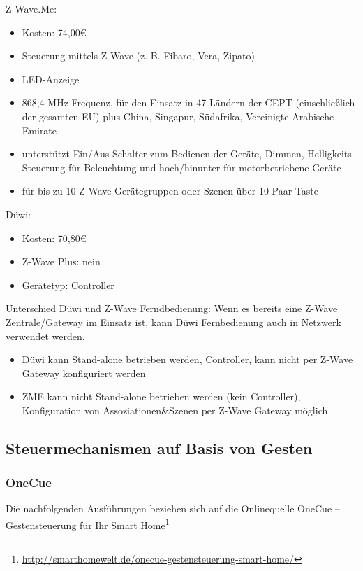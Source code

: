 \noindent
Z-Wave.Me: 

\begin{itemize}
\item Kosten: 74,00€
\item Steuerung mittels Z-Wave (z. B. Fibaro, Vera, Zipato) 
\item LED-Anzeige
\item 868,4 MHz Frequenz, für den Einsatz in 47 Ländern der CEPT (einschließlich der gesamten EU) plus China, Singapur, Südafrika, Vereinigte Arabische Emirate
\item unterstützt Ein/Aus-Schalter zum Bedienen der Geräte, Dimmen, Helligkeits-Steuerung für Beleuchtung und hoch/hinunter für motorbetriebene Geräte
\item für bis zu 10 Z-Wave-Gerätegruppen oder Szenen über 10 Paar Taste
\end{itemize}

\noindent
Düwi: 

\begin{itemize}
\item Kosten: 70,80€
\item Z-Wave Plus: nein 
\item Gerätetyp: Controller
\end{itemize}

\noindent
Unterschied Düwi und Z-Wave Ferndbedienung: 
Wenn es bereits eine Z-Wave Zentrale/Gateway im Einsatz ist, kann Düwi Fernbedienung auch in
Netzwerk verwendet werden.

\begin{itemize}
\item Düwi kann Stand-alone betrieben werden, Controller, kann nicht per Z-Wave Gateway konfiguriert werden
\item ZME kann nicht Stand-alone betrieben werden (kein Controller), Konfiguration von Assoziationen\&Szenen per Z-Wave Gateway möglich
\end{itemize}

\subsection{Steuermechanismen auf Basis von Gesten}

\subsubsection{OneCue}

Die nachfolgenden Ausführungen beziehen sich auf die Onlinequelle \glqq OneCue – Gestensteuerung für Ihr Smart Home\grqq\footnote{\url{http://smarthomewelt.de/onecue-gestensteuerung-smart-home/}}

